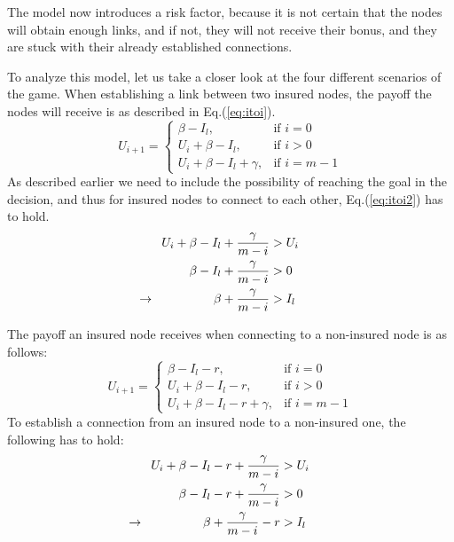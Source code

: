  The model now introduces a risk factor, because it is not certain that the nodes will obtain enough links, and if not, they will not receive their bonus, and they are stuck with their already established connections. 

To analyze this model, let us take a closer look at the four different scenarios of the game. When establishing a link between two insured nodes, the payoff the nodes will receive is as described in Eq.(\ref{eq:itoi}).
\begin{equation}
    U_{i+1}= 
\begin{cases}
    \beta - I_{l},& \text{if } i = 0\\
    U_{i}+\beta -I_{l},& \text{if }  i>0\\
    U_{i}+\beta -I_{l}+\gamma,& \text{if } i=m-1
    
\end{cases}
\label{eq:itoi}
\end{equation}
As described earlier we need to include the possibility of reaching the goal in the decision, and thus for insured nodes to connect to each other, Eq.(\ref{eq:itoi2}) has to hold.
\begin{eqnarray}
U_{i}+\beta-I_{l}+\frac{\gamma}{m-i}&>U_{i} \nonumber \\ 
\beta-I_{l}+\frac{\gamma}{m-i}&>0 \nonumber \\ 
\llap{$\rightarrow$\hspace{50pt}} \beta+\frac{\gamma}{m-i}&>I_{l} 
\label{eq:itoi2}
\end{eqnarray}

The payoff an insured node receives when connecting to a non-insured node is as follows:
\begin{equation}
    U_{i+1}= 
\begin{cases}
    \beta  - I_{l} -r,& \text{if } i = 0\\
    U_{i}+\beta -I_{l}-r,& \text{if }  i>0\\
    U_{i}+\beta -I_{l}-r+\gamma,& \text{if } i=m-1
\end{cases}
\label{eq:itonoti}
\end{equation}
To establish a connection from an insured node to a non-insured one, the following has to hold:
\begin{eqnarray}
U_{i}+\beta-I_{l}-r+\frac{\gamma}{m-i}&>U_{i} \nonumber \\ 
\beta-I_{l}-r+\frac{\gamma}{m-i}&>0 \nonumber \\ 
\llap{$\rightarrow$\hspace{50pt}} \beta+\frac{\gamma}{m-i}-r&>I_{l} 
\end{eqnarray}

